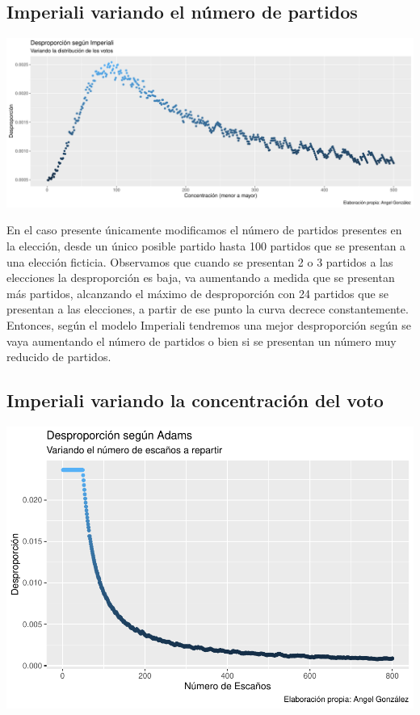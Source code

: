 \documentclass[12pt,a4paper,]{book}
\numberwithin{dummy}{section}
\theoremstyle{ocrenumbox}
\theoremstyle{blacknumex}
\theoremstyle{blacknumbox}
\theoremstyle{ocrenum}
\theoremstyle{ocrenum}
\begin{document}
\hypertarget{imperiali-variando-el-nuxfamero-de-partidos}{%
\subsection{Imperiali variando el número de
partidos}\label{imperiali-variando-el-nuxfamero-de-partidos}}

\begin{center}\includegraphics[width=0.95\linewidth]{figurasR/unnamed-chunk-29-1} \end{center}

En el caso presente únicamente modificamos el número de partidos
presentes en la elección, desde un único posible partido hasta 100
partidos que se presentan a una elección ficticia. Observamos que cuando
se presentan 2 o 3 partidos a las elecciones la desproporción es baja,
va aumentando a medida que se presentan más partidos, alcanzando el
máximo de desproporción con 24 partidos que se presentan a las
elecciones, a partir de ese punto la curva decrece constantemente.
Entonces, según el modelo Imperiali tendremos una mejor desproporción
según se vaya aumentando el número de partidos o bien si se presentan un
número muy reducido de partidos.

\hypertarget{imperiali-variando-la-concentraciuxf3n-del-voto}{%
\subsection{Imperiali variando la concentración del
voto}\label{imperiali-variando-la-concentraciuxf3n-del-voto}}

\begin{center}\includegraphics[width=0.95\linewidth]{figurasR/unnamed-chunk-30-1} \end{center}
\end{document}
